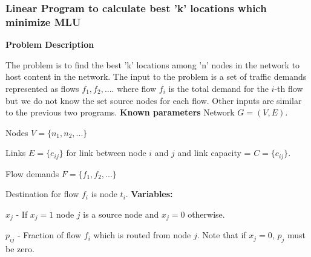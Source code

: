 

\subsubsection{Linear Program to calculate best 'k' locations which minimize MLU}

\textbf{Problem Description}

The problem is to find the best 'k' locations among 'n'  nodes in the network to host content in the network. 
The input to the problem is a set of traffic demands represented as flows ${f_1,f_2,....}$  where flow $f_i$ is the total demand for the $i$-th flow but we do not know the set source nodes for each flow. Other inputs are similar to the previous two programs. 
\newline
\newline
\textbf{Known parameters}
Network  $G = (V,E)$.

Nodes $V = \{ n_1, n_2, ... \}$

Links $ E = \{ e_{ij}\}$ for link between node $i$ and  $j$ and link capacity = $ C = \{ c_{ij}\}$.

Flow demands $F = \{f_1, f_2, ... \}$ 

Destination for flow $f_i$ is node  $t_i$.
\newline
\newline
\textbf{Variables:}

${x_j}$ - If $x_j = 1$ node $j$ is a source node and $x_j = 0$ otherwise.

$p_{ij}$ - Fraction of flow $f_i$ which is routed from node $j$. Note that if $x_j = 0$, $p_j$ must be zero.

